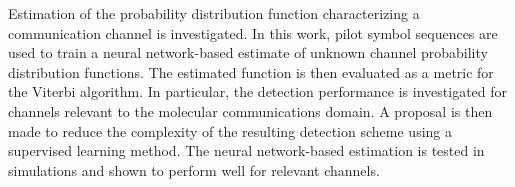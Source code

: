 Estimation of the probability distribution function characterizing a communication channel is investigated. In this work, pilot symbol sequences are used to train a neural network-based estimate of unknown channel probability distribution functions. The estimated function is then evaluated as a metric for the Viterbi algorithm. In particular, the detection performance is investigated for channels relevant to the molecular communications domain. A proposal is then made to reduce the complexity of the resulting detection scheme using a supervised learning method. The neural network-based estimation is tested in simulations and shown to perform well for relevant channels. 